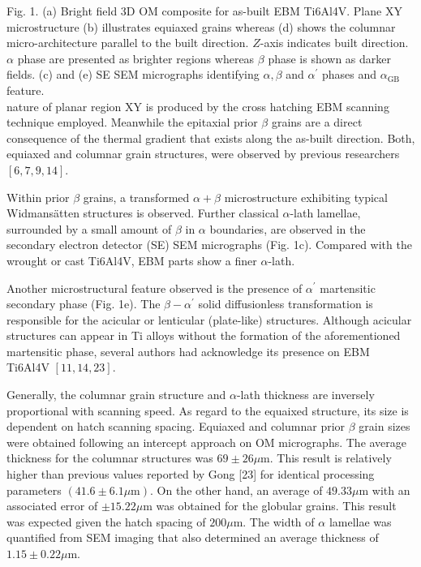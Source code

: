 \documentclass[10pt]{article}
\begin{document}
Fig. 1. (a) Bright field 3D OM composite for as-built EBM Ti6Al4V. Plane XY microstructure (b) illustrates equiaxed grains whereas (d) shows the columnar micro-architecture parallel to the built direction. $Z$-axis indicates built direction. $\alpha$ phase are presented as brighter regions whereas $\beta$ phase is shown as darker fields. (c) and (e) SE SEM micrographs identifying $\alpha, \beta$ and $\alpha^{\prime}$ phases and $\alpha_{\mathrm{GB}}$ feature.\\
nature of planar region $\mathrm{XY}$ is produced by the cross hatching EBM scanning technique employed. Meanwhile the epitaxial prior $\beta$ grains are a direct consequence of the thermal gradient that exists along the as-built direction. Both, equiaxed and columnar grain structures, were observed by previous researchers $[6,7,9,14]$.

Within prior $\beta$ grains, a transformed $\alpha+\beta$ microstructure exhibiting typical Widmansätten structures is observed. Further classical $\alpha$-lath lamellae, surrounded by a small amount of $\beta$ in $\alpha$ boundaries, are observed in the secondary electron detector (SE) SEM micrographs (Fig. 1c). Compared with the wrought or cast Ti6Al4V, EBM parts show a finer $\alpha$-lath.

Another microstructural feature observed is the presence of $\alpha^{\prime}$ martensitic secondary phase (Fig. 1e). The $\beta-\alpha^{\prime}$ solid diffusionless transformation is responsible for the acicular or lenticular (plate-like) structures. Although acicular structures can appear in Ti alloys without the formation of the aforementioned martensitic phase, several authors had acknowledge its presence on EBM Ti6Al4V $[11,14,23]$.

Generally, the columnar grain structure and $\alpha$-lath thickness are inversely proportional with scanning speed. As regard to the equaixed structure, its size is dependent on hatch scanning spacing. Equiaxed and columnar prior $\beta$ grain sizes were obtained following an intercept approach on OM micrographs. The average thickness for the columnar structures was $69 \pm 26 \mu \mathrm{m}$. This result is relatively higher than previous values reported by Gong [23] for identical processing parameters $(41.6 \pm 6.1 \mu \mathrm{m})$. On the other hand, an average of $49.33 \mu \mathrm{m}$ with an associated error of $\pm 15.22 \mu \mathrm{m}$ was obtained for the globular grains. This result was expected given the hatch spacing of $200 \mu \mathrm{m}$. The width of $\alpha$ lamellae was quantified from SEM imaging that also determined an average thickness of $1.15 \pm 0.22 \mu \mathrm{m}$.
\end{document}
